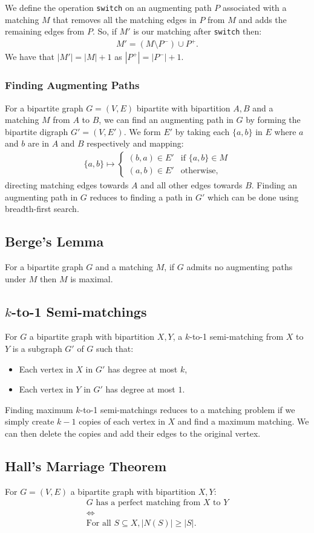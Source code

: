 We define the operation \texttt{switch} on an augmenting path $P$ 
associated with a matching $M$ that removes all the matching edges 
in $P$ from $M$ and adds the remaining edges from $P$.
So, if $M'$ is our matching after \texttt{switch} then: 
\begin{gather*}
  M' = (M \setminus P^-) \cup P^+.
\end{gather*} We have that $|M'| = |M| + 1$ as $|P^+| = |P^-| + 1$.

\subsubsection{Finding Augmenting Paths}

For a bipartite graph $G = (V, E)$ bipartite with bipartition $A, B$
and a matching $M$ from $A$ to $B$, we can find an augmenting path in
$G$ by forming the bipartite digraph $G' = (V, E')$. We form $E'$ by
taking each $\{a, b\}$ in $E$ where $a$ and $b$ are in $A$ and $B$ 
respectively and mapping:
\begin{gather*}
  \{a, b\} \mapsto \begin{cases}
    (b, a) \in E' & \text{if } \{a, b\} \in M \\
    (a, b) \in E' & \text{otherwise},
  \end{cases}
\end{gather*} directing matching edges towards $A$ and all other edges
towards $B$. Finding an augmenting path in $G$ reduces to finding a
path in $G'$ which can be done using breadth-first search.

\subsection{Berge's Lemma}

For a bipartite graph $G$ and a matching $M$, if $G$ admits no augmenting
paths under $M$ then $M$ is maximal.

\subsection{$k$-to-1 Semi-matchings}

For $G$ a bipartite graph with bipartition $X, Y$,
a $k$-to-1 semi-matching from $X$ to $Y$ is a subgraph $G'$ of $G$
such that: \begin{itemize}
  \item Each vertex in $X$ in $G'$ has degree at most $k$,
  \item Each vertex in $Y$ in $G'$ has degree at most $1$.
\end{itemize} Finding maximum $k$-to-1 semi-matchings reduces to 
a matching problem if we simply create $k - 1$ copies of each
vertex in $X$ and find a maximum matching. We can then delete the
copies and add their edges to the original vertex.

\subsection{Hall's Marriage Theorem}

For $G = (V, E)$ a bipartite graph with bipartition $X, Y$: \begin{gather*}
  G \text{ has a perfect matching from } X \text{ to } Y \\
  \Longleftrightarrow \\
  \text{For all } S \subseteq X, |N(S)| \geq |S|.
\end{gather*}